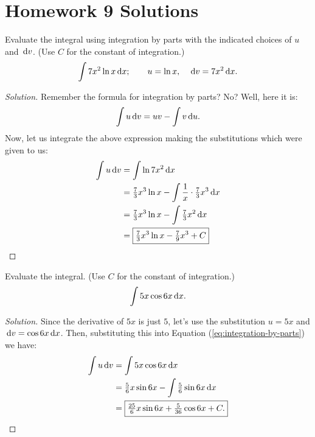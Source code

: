\chapter{Homework 9 Solutions}
\begin{problem}[WebAssign HW 9, 1]
Evaluate the integral using integration by parts with the indicated choices
of $u$ and $\,\mathrm{d} v$. (Use $C$ for the constant of integration.)
\[
\int 7x^2\ln x\,\mathrm{d} x;\qquad
u=\ln x,\quad
\,\mathrm{d} v=7x^2\,\mathrm{d} x.
\]
\end{problem}
\begin{proof}[Solution]
Remember the formula for integration by parts? No? Well, here it is:
\begin{equation}
  \label{eq:integration-by-parts}
\int u\,\mathrm{d} v=uv-\int v\,\mathrm{d} u.
\end{equation}
Now, let us integrate the above expression making the substitutions which
were given to us:
\begin{align*}
\int u\,\mathrm{d} v&=\int\ln 7x^2\,\mathrm{d} x\\
             &=\tfrac{7}{3}x^3\ln x-\int\frac{1}{x}\cdot \tfrac{7}{3}x^3\,\mathrm{d}
               x\\
             &=\tfrac{7}{3}x^3\ln x-\int \tfrac{7}{3}x^2 \,\mathrm{d} x\\
             &=\boxed{\tfrac{7}{3}x^3\ln x-\tfrac{7}{9}x^3+C}
\end{align*}
\end{proof}

\begin{problem}[WebAssign HW 9, 2]
Evaluate the integral. (Use $C$ for the constant of integration.)
\[
\int 5x\cos 6x\,\mathrm{d} x.
\]
\end{problem}
\begin{proof}[Solution]
Since the derivative of $5x$ is just $5$, let's use the substitution $u=5x$
and $\,\mathrm{d} v=\cos 6x\,\mathrm{d} x$. Then, substituting this into Equation
(\ref{eq:integration-by-parts}) we have:
\begin{align*}
  \int u\,\mathrm{d} v&=\int 5x\cos 6x\,\mathrm{d} x\\
               &=\tfrac{5}{6}x\sin 6x-\int \tfrac{5}{6}\sin 6x\,\mathrm{d} x\\
               &=\boxed{\tfrac{25}{6}x\sin 6x+\tfrac{5}{36}\cos 6x+C.}
\end{align*}
\end{proof}

